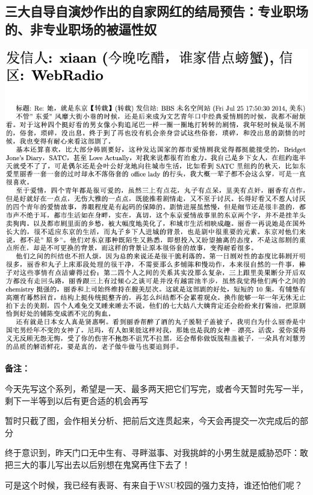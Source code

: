 \documentclass[9pt, b5paper]{article}
\begin{document}
\subsection{三大自导自演炒作出的自家网红的结局预告：专业职场的、非专业职场的被逼性奴}
\label{sec:orgc0a103e}

\begin{center}
\includegraphics[width=.9\linewidth]{./pic/p2p201.png}
\end{center}

\textbf{备注：}

今天先写这个系列，希望是一天、最多两天把它们写完，或者今天暂时先写一半，剩下一半等到以后有更合适的机会再写

暂时只截了图，会作相关分析、把前后文连贯起来，今天会再提交一次完成后的部分

终于意识到，昨天门口无中生有、寻畔滋事、对我挑衅的小男生就是威胁恐吓：敢把三大的事儿写出去以后别想在鬼窝再住下去了！

可是这个时候，我已经有表哥、有来自于WSU校园的强力支持，谁还怕他们呢？
\end{document}
